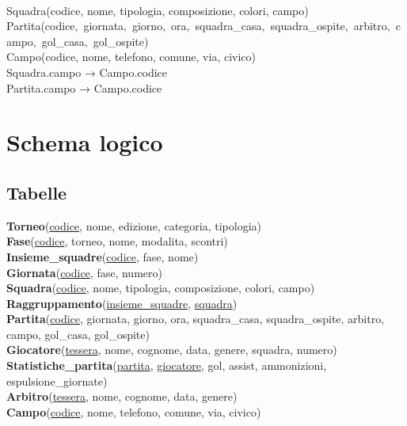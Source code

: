 \documentclass[11pt, openany]{article}
\theoremstyle{definition}
\theoremstyle{plain}
\theoremstyle{remark}
\begin{document}
			\vspace{.3cm}
			\\\vspace{.2cm}
			Squadra(codice, nome, tipologia, composizione, colori, campo)\\
			\mbox{Partita(codice, giornata, giorno, ora, squadra\_casa, squadra\_ospite, arbitro, campo, gol\_casa, gol\_ospite)}\\
			Campo(codice, nome, telefono, comune, via, civico)\\
			Squadra.campo → Campo.codice\\
			Partita.campo → Campo.codice
		
		\raggedright
		\section{Schema logico}\label{tab:schema logico}
			\begin{tcolorbox}[width=\textwidth, colback={Cornsilk2}]
				\subsection{Tabelle}
					\textbf{Torneo}(\underline{codice}, nome, edizione, categoria, tipologia)\\
					\textbf{Fase}(\underline{codice}, torneo, nome, modalita, scontri)\\
					\textbf{Insieme\_squadre}(\underline{codice}, fase, nome)\\
					\textbf{Giornata}(\underline{codice}, fase, numero)\\
					\textbf{Squadra}(\underline{codice}, nome, tipologia, composizione, colori, campo)\\
					\textbf{Raggruppamento}(\underline{insieme\_squadre}, \underline{squadra})\\
					\textbf{Partita}(\underline{codice}, giornata, giorno, ora, squadra\_casa, squadra\_ospite, arbitro, campo, gol\_casa, gol\_ospite)\\
					\textbf{Giocatore}(\underline{tessera}, nome, cognome, data, genere, squadra, numero)\\
					\textbf{Statistiche\_partita}(\underline{partita}, \underline{giocatore}, gol, assist, ammonizioni, espulsione\_giornate)\\
					\textbf{Arbitro}(\underline{tessera}, nome, cognome, data, genere)\\
					\textbf{Campo}(\underline{codice}, nome, telefono, comune, via, civico)
			\end{tcolorbox}
			
\end{document}
